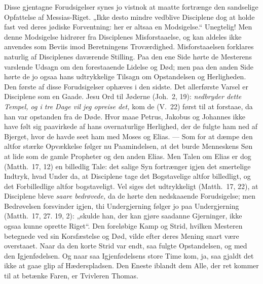 \documentclass[12pt,a4paper]{book}
\begin{document}
Disse gjentagne Forudsigelser synes jo vistnok at maatte fortrænge den sandselige
Opfattelse af Messias-Riget. „Ikke desto mindre vedblive Disciplene dog at holde
fast ved deres jødiske Forventning: her er altsaa en Modsigelse.“ Unegtelig! Men
denne Modsigelse hidrører fra Disciplenes Misforstaaelse, og kan aldeles ikke
anvendes som Beviis imod Beretningens Troværdighed. Misforstaaelsen forklares
naturlig af Disciplenes daværende Stilling. Paa den ene Side hørte de Mesterens
varslende Udsagn om den forestaaende Lidelse og Død; men paa den anden Side hørte
de jo ogsaa hans udtrykkelige Tilsagn om Opstandelsen og Herligheden. Den første
af disse Forudsigelser ophæves i den sidste. Det allerførste Varsel er
Disciplene som en Gaade. Jesu Ord til Jøderne
(Joh.\ 2, 19): \emph{nedbryder dette Tempel, og i tre Dage vil jeg opreise det,}
kom de (V.\ 22) først til at forstaae, da han var opstanden fra de Døde. Hvor maae
Petrus, Jakobus og Johannes ikke have følt sig paavirkede af hans overnaturlige
Herlighed, der de fulgte ham ned af Bjerget, hvor de havde seet ham med Moses og
Elias. --- Som for at dæmpe den altfor stærke Opvækkelse følger nu Paamindelsen,
at det burde Menneskens Søn at lide som de gamle Propheter og den anden Elias.
Men Talen om Elias er dog (Matth.\ 17, 12) en billedlig Tale: det salige Syn
fortrænger igjen det smertelige Indtryk, hvad Under da, at Disciplene tage det
Bogstavelige altfor billedligt, og det Forbilledlige altfor bogstaveligt. Vel
siges det udtrykkeligt (Matth.\ 17, 22), at Disciplene bleve \emph{saare
bedrøvede,} da de hørte den nedskaaende Forudsigelse; men Bedrøvelsen forsvinder
igjen, thi Undergjerning følger jo paa Undergjerning (Matth.\ 17, 27. 19, 2):
„skulde han, der kan gjøre saadanne Gjerninger, ikke ogsaa kunne oprette Riget“.
Den foreløbige Kamp og Strid, hvilken Mesteren betegnede ved sin Korsfæstelse og
Død, vilde efter deres Mening snart være overstaaet. Naar da den korte Strid var
endt, saa fulgte Opstandelsen, og med den Igjenfødelsen. Og naar saa
Igjenfødelsens store Time kom, ja, saa gjaldt det ikke at gaae glip af
Hæderspladsen. Den Eneste iblandt dem Alle, der ret kommer til at betænke Faren,
er Tvivleren Thomas.
\end{document}
